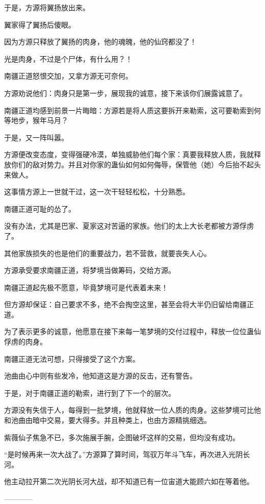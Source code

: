 \begin{this_body}
于是，方源将翼扬放出来。

翼家得了翼扬后傻眼。

因为方源只释放了翼扬的肉身，他的魂魄，他的仙窍都没了！

光是肉身，不过是个尸体，有什么用？！

南疆正道怒恨交加，又拿方源无可奈何。

方源劝说他们：肉身只是第一步，展现我的诚意，接下来该你们展露诚意了。

南疆正道均感到前景一片晦暗：方源若是将人质这要拆开来勒索，这可要勒索到何等地步，猴年马月？

于是，又一阵叫嚣。

方源便改变态度，变得强硬冷漠，单独威胁他们每个家：真要我释放人质，我就释放你们的敌对势力。并且对你家的蛊仙如何如何侮辱，保管他（她）今后抬不起头来做人。

这事情方源上一世就干过，这一次干轻轻松松，十分熟悉。

南疆正道可耻的怂了。

没有办法，尤其是巴家、夏家这对苦逼的家族。他们的太上大长老都被方源俘虏了。

其他家族损失的也是他们的重要战力，若不营救，就要丧失人心。

方源承受要求南疆正道，将梦境当做筹码，交给方源。

南疆正道起先极不愿意，毕竟梦境可是代表着未来！

但方源却保证：自己要求不多，绝不会掏空这里，甚至会将大半仍旧留给南疆正道。

为了表示更多的诚意，他愿意在接下来每一笔梦境的交付过程中，释放一位位蛊仙俘虏的肉身。

南疆正道无法可想，只得接受了这个方案。

池曲由心中则有些发冷，他知道这是方源的反击，还有警告。

于是，对于南疆正道的勒索，进行到了下一个的层次。

方源没有失信于人，每得到一批梦境，他就释放一位人质的肉身。这些梦境可比他和池曲由暗中交易，要大得多。并且种类上，也由方源精挑细选。

紫薇仙子焦急不已，多次施展手腕，企图破坏这样的交易，但均没有成功。

“是时候再来一次大战了。”方源算了算时间，驾驭万年斗飞车，再次进入光阴长河。

他主动拉开第二次光阴长河大战，却不知道已有一位宙道大能顾六如在等着他。

------------

\end{this_body}

